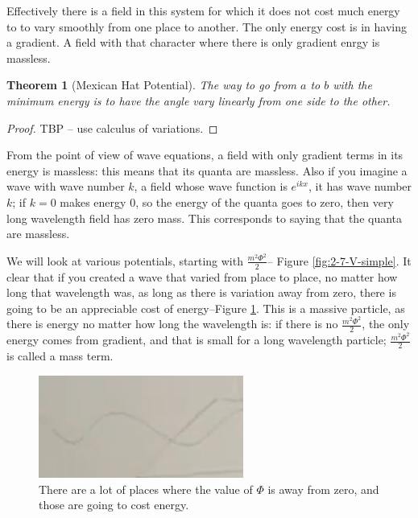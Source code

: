 \documentclass[]{article}
\newtheorem{thm}{Theorem}
\begin{document}
Effectively there is a field in this system  for which it does not cost much energy to to vary smoothly from one place to another. The only energy cost is in having a gradient. A field with that character where there is only gradient enrgy is massless.

\begin{thm}[Mexican Hat Potential]
	The way to go from $a$ to $b$ with the minimum energy is to have the angle vary linearly from one side to the other.
\end{thm}
\begin{proof}
	TBP -- use calculus of variations.
\end{proof}

 From the point of view of wave equations, a field with only gradient terms in its energy is massless: this means that its quanta are massless. Also if you imagine a wave with wave number $k$, a field whose wave function is $e^{ikx}$, it has wave number $k$; if $k=0$ makes energy $0$, so the energy of the quanta goes to zero, then very long wavelength field has zero mass. This corresponds to saying that the quanta are massless.
 
We will look at various potentials, starting with $\frac{m^2 \Phi^2}{2}$--  Figure \ref{fig:2-7-V-simple}. It clear that if you created a wave that varied from place to place, no matter how long that wavelength was, as long as there is  variation away from zero, there is going to be an appreciable cost of energy--Figure \ref{fig:2-7-variation-from-zero}. This is a massive particle, as there is energy no matter how long the wavelength is: if there is no $\frac{m^2 \Phi^2}{2}$, the only energy comes from gradient, and that is small for a long wavelength particle; $\frac{m^2 \Phi^2}{2}$ is called a mass term.

\begin{figure}[H]
	\begin{center}
		\caption[There are a lot of places where the value of $\Phi$ is away from zero]{There are a lot of places where the value of $\Phi$ is away from zero, and those are going to cost energy.}\label{fig:2-7-variation-from-zero}
		\includegraphics[width=0.6\textwidth]{2-7-variation-from-zero}
	\end{center}
\end{figure}
\end{document}
